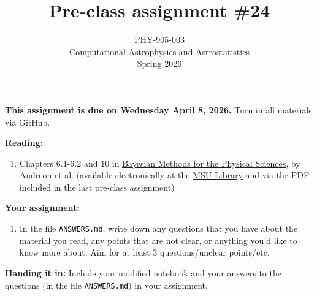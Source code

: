 \documentclass[10pt]{article}
\title{Pre-class assignment \#24}
\author{PHY-905-003\\Computational Astrophysics and
  Astrostatistics\\Spring 2026}
\date{} %
\begin{document}
 
\maketitle

\vspace{-10mm}

\noindent
\textbf{This assignment is due on Wednesday April 8, 2026.}
 Turn in all materials via GitHub.

\vspace{5mm}

\noindent
\textbf{Reading:}

\begin{enumerate}

\item Chapters 6.1-6.2 and 10 in
  \href{http://www.springer.com/us/book/9783319152868}{Bayesian
    Methods for the Physical Sciences}, by Andreon et al.  (available
  electronically 
  at the
  \href{https://link-springer-com.proxy2.cl.msu.edu/book/10.1007\%2F978-3-319-15287-5}{MSU
    Library} and via the  PDF included in the last pre-class assignment)

\end{enumerate}

\noindent
\textbf{Your assignment:}

\begin{enumerate}

\item In the file \texttt{ANSWERS.md}, write down any questions that
you have about the material you read, any points that are not clear, or anything you'd
like to know more about.  Aim for at
least 3 questions/unclear points/etc. 

\end{enumerate}

\noindent \textbf{Handing it in:} Include your modified notebook and
your answers to the questions (in the file \texttt{ANSWERS.md})
in your assignment.
\end{document}

